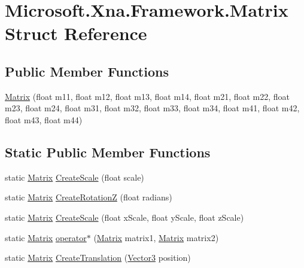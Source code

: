 \hypertarget{struct_microsoft_1_1_xna_1_1_framework_1_1_matrix}{}\section{Microsoft.\+Xna.\+Framework.\+Matrix Struct Reference}
\label{struct_microsoft_1_1_xna_1_1_framework_1_1_matrix}
\subsection*{Public Member Functions}
\begin{DoxyCompactItemize}
\item 
\hyperlink{struct_microsoft_1_1_xna_1_1_framework_1_1_matrix_a11d18382a1cb086fb083445e03a474eb}{Matrix} (float m11, float m12, float m13, float m14, float m21, float m22, float m23, float m24, float m31, float m32, float m33, float m34, float m41, float m42, float m43, float m44)
\end{DoxyCompactItemize}
\subsection*{Static Public Member Functions}
\begin{DoxyCompactItemize}
\item 
static \hyperlink{struct_microsoft_1_1_xna_1_1_framework_1_1_matrix}{Matrix} \hyperlink{struct_microsoft_1_1_xna_1_1_framework_1_1_matrix_a8cf3656c9e4a03920e1808b59a79ded8}{Create\+Scale} (float scale)
\item 
static \hyperlink{struct_microsoft_1_1_xna_1_1_framework_1_1_matrix}{Matrix} \hyperlink{struct_microsoft_1_1_xna_1_1_framework_1_1_matrix_af3ac245922d56f3ca784f956259a172b}{Create\+Rotation\+Z} (float radians)
\item 
static \hyperlink{struct_microsoft_1_1_xna_1_1_framework_1_1_matrix}{Matrix} \hyperlink{struct_microsoft_1_1_xna_1_1_framework_1_1_matrix_aaaf7dbaf215d211c34a83dd7e6b9993f}{Create\+Scale} (float x\+Scale, float y\+Scale, float z\+Scale)
\item 
static \hyperlink{struct_microsoft_1_1_xna_1_1_framework_1_1_matrix}{Matrix} \hyperlink{struct_microsoft_1_1_xna_1_1_framework_1_1_matrix_a70660ce8b7a78015d721d711364b2a07}{operator$\ast$} (\hyperlink{struct_microsoft_1_1_xna_1_1_framework_1_1_matrix}{Matrix} matrix1, \hyperlink{struct_microsoft_1_1_xna_1_1_framework_1_1_matrix}{Matrix} matrix2)
\item 
static \hyperlink{struct_microsoft_1_1_xna_1_1_framework_1_1_matrix}{Matrix} \hyperlink{struct_microsoft_1_1_xna_1_1_framework_1_1_matrix_a7aad60b63a1378427cbd855bf2655542}{Create\+Translation} (\hyperlink{struct_microsoft_1_1_xna_1_1_framework_1_1_vector3}{Vector3} position)
\end{DoxyCompactItemize}
